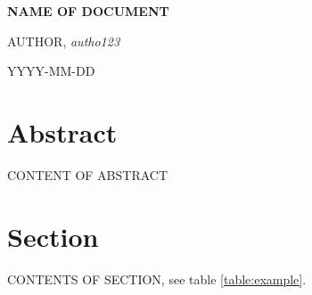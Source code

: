 \documentclass[11pt]{article} %
\date{} %
\begin{document}
	\begin{titlepage}
		\begin{center}
			
			{\Large\bfseries NAME OF DOCUMENT} \\ %
			
			\vspace{2\baselineskip}
			
			AUTHOR, \textit{autho123} \\ %
			
			\vspace{2\baselineskip}
			
			YYYY-MM-DD	%
			
		\end{center}
	\end{titlepage}
	
	\setcounter{secnumdepth}{0} %
	\section*{Abstract}
	
	CONTENT OF ABSTRACT 
	\pagebreak
	
	\setcounter{secnumdepth}{2} %
	
	\tableofcontents	%
	
	\pagebreak
	
	
	
	\section{Section} 	%
	
	CONTENTS OF SECTION, see table \ref{table:example}.
	
\end{document}
